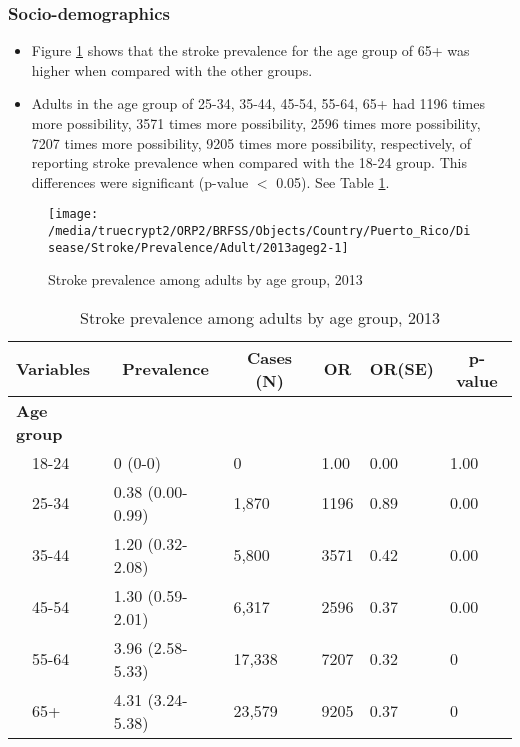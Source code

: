 \newpage
\subsubsection{Socio-demographics}

\begin{itemize}

\item Figure \ref{fig:age.Stroke.2013} shows that the stroke prevalence for the age group of
65+
was higher when compared with the other groups.

\item Adults in the age group of 25-34, 35-44, 45-54, 55-64, 65+ had 1196 times more possibility, 3571 times more possibility, 2596 times more possibility, 7207 times more possibility, 9205 times more possibility, respectively, of reporting stroke prevalence when compared with the 18-24 group. This differences were significant (p-value $<$ 0.05). See Table \ref{tab:age.Stroke.2013}.


\end{itemize}


\begin{figure}[H]
\caption{Stroke prevalence among adults by age group, 
2013}
\begin{knitrout}
\color{fgcolor}

{\centering \texttt{[image: /media/truecrypt2/ORP2/BRFSS/Objects/Country/Puerto\_Rico/Disease/Stroke/Prevalence/Adult/2013ageg2-1]} 

}



\end{knitrout}
\label{fig:age.Stroke.2013}
\end{figure}

\begin{table}[H]
\caption{Stroke prevalence  among adults by age group, 2013\label{tab:age.Stroke.2013}} 
\begin{center}
\begin{tabular}{llllll}
\hline\hline
\multicolumn{1}{l}{Variables}&\multicolumn{1}{c}{Prevalence}&\multicolumn{1}{c}{Cases (N)}&\multicolumn{1}{c}{OR}&\multicolumn{1}{c}{OR(SE)}&\multicolumn{1}{c}{p-value}\tabularnewline
\hline
{\bfseries Age group}&&&&&\tabularnewline
~~18-24&0 (0-0)&     0&1.00&0.00&1.00\tabularnewline
~~25-34&0.38 (0.00-0.99)& 1,870&1196&0.89&0.00\tabularnewline
~~35-44&1.20 (0.32-2.08)& 5,800&3571&0.42&0.00\tabularnewline
~~45-54&1.30 (0.59-2.01)& 6,317&2596&0.37&0.00\tabularnewline
~~55-64&3.96 (2.58-5.33)&17,338&7207&0.32&0\tabularnewline
~~65+&4.31 (3.24-5.38)&23,579&9205&0.37&0\tabularnewline
\hline
\end{tabular}\end{center}

\end{table}


